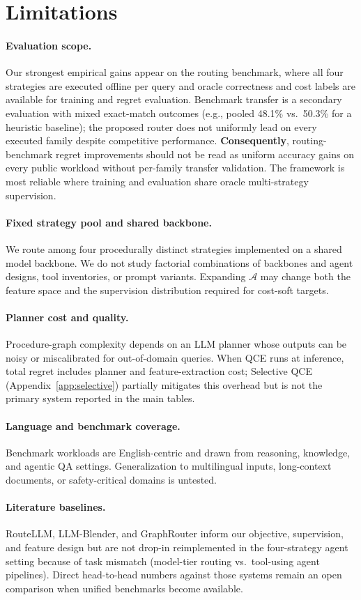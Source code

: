 \section{Limitations}
\label{sec:limitations}

\paragraph{Evaluation scope.}
Our strongest empirical gains appear on the routing benchmark, where all four strategies are
executed offline per query and oracle correctness and cost labels are available for training
and regret evaluation.
Benchmark transfer is a secondary evaluation with mixed exact-match outcomes (e.g., pooled
48.1\% vs.\ 50.3\% for a heuristic baseline); the proposed router does not uniformly lead on
every executed family despite competitive performance.
\textbf{Consequently}, routing-benchmark regret improvements should not be read as uniform
accuracy gains on every public workload without per-family transfer validation.
The framework is most reliable where training and evaluation share oracle multi-strategy
supervision.

\paragraph{Fixed strategy pool and shared backbone.}
We route among four procedurally distinct strategies implemented on a shared model backbone.
We do not study factorial combinations of backbones and agent designs, tool inventories, or
prompt variants.
Expanding $\mathcal{A}$ may change both the feature space and the supervision distribution
required for cost-soft targets.

\paragraph{Planner cost and quality.}
Procedure-graph complexity depends on an LLM planner whose outputs can be noisy or miscalibrated
for out-of-domain queries.
When QCE runs at inference, total regret includes planner and feature-extraction cost;
Selective QCE (Appendix~\ref{app:selective}) partially mitigates this overhead but is not the
primary system reported in the main tables.

\paragraph{Language and benchmark coverage.}
Benchmark workloads are English-centric and drawn from reasoning, knowledge, and agentic QA
settings.
Generalization to multilingual inputs, long-context documents, or safety-critical domains is
untested.

\paragraph{Literature baselines.}
RouteLLM, LLM-Blender, and GraphRouter inform our objective, supervision, and feature design but
are not drop-in reimplemented in the four-strategy agent setting because of task mismatch
(model-tier routing vs.\ tool-using agent pipelines).
Direct head-to-head numbers against those systems remain an open comparison when unified
benchmarks become available.

